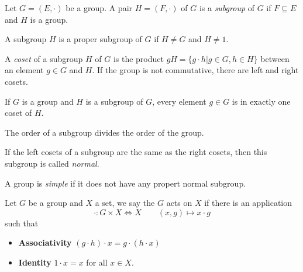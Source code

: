 \begin{definition}[Subgroup]
  Let $G = (E, \cdot)$ be a group. A pair $H = (F, \cdot)$ of $G$ is a \textit{subgroup} of $G$ if $F \subseteq E$ and $H$ is a group.
\end{definition}

\begin{definition}
  A subgroup $H$ is a proper subgroup of $G$ if $H \neq G$ and $H \neq {1}$.
\end{definition}

\begin{definition}[Coset]
  A \textit{coset} of a subgroup $H$ of $G$ is the product $gH = \{g \cdot h | g \in G, h \in H\}$ between an element $g \in G$ and $H$. If the group is not commutative, there are left and right cosets.
\end{definition}

\begin{property}
  If $G$ is a group and $H$ is a subgroup of $G$, every element $g \in G$ is in exactly one coset of $H$.
\end{property}

\begin{corollary}
  \label{magic-formula}
  The order of a subgroup divides the order of the group.
\end{corollary}

\begin{definition}
  If the left cosets of a subgroup are the same as the right cosets, then this subgroup is called \textit{normal}.
\end{definition}

\begin{definition}
  A group is \textit{simple} if it does not have any propert normal subgroup.
\end{definition}

\begin{definition}[Action]
  Let $G$ be a group and $X$ a set, we say the $G$ acts on $X$ if there is an application
  \[
    \cdot : G \times X \Leftrightarrow X \qquad (x,g) \mapsto x \cdot g
  \]
  such that
  \begin{itemize}
    \item \textbf{Associativity} $(g \cdot h) \cdot x = g \cdot (h \cdot x)$
    \item \textbf{Identity} $ 1 \cdot x = x$ for all $x \in X$.
  \end{itemize}
\end{definition}

